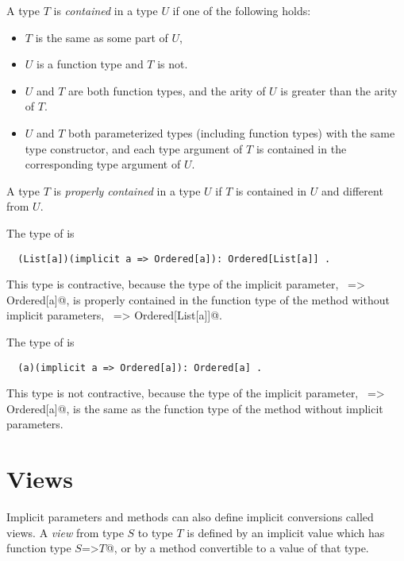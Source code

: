 A type $T$ is {\em contained} in a type $U$ if one of the following holds:
\begin{itemize}
\item $T$ is the same as some part of $U$,  
\item $U$ is a function type and $T$ is not.
\item $U$ and $T$ are both function types, and the arity of $U$ is greater than 
      the arity of $T$.
\item $U$ and $T$ both parameterized types (including function types)
      with the same type constructor,
      and each type argument of $T$ is contained in the corresponding type argument of $U$.
\end{itemize}
A type $T$ is {\em properly contained} in a type $U$ if $T$ is contained
in $U$ and different from $U$.

\example The type of  is
\begin{lstlisting}
  (List[a])(implicit a => Ordered[a]): Ordered[List[a]] .
\end{lstlisting}
This type is contractive, because the type of the implicit parameter,
~\lstinline@a => Ordered[a]@, is properly contained in the function type
of the method without implicit parameters, ~\lstinline@List[a] => Ordered[List[a]]@.

The type of  is
\begin{lstlisting}
  (a)(implicit a => Ordered[a]): Ordered[a] .
\end{lstlisting}
This type is not contractive, because the type of the implicit parameter,
~\lstinline@a => Ordered[a]@, is the same as the function type
of the method without implicit parameters. 


\section{Views}\label{sec:views}

Implicit parameters and methods can also define implicit conversions
called views. A {\em view} from type $S$ to type $T$ is
defined by an implicit value which has function type
\lstinline@$S$=>$T$@, or by a method convertible to a value of that type.

